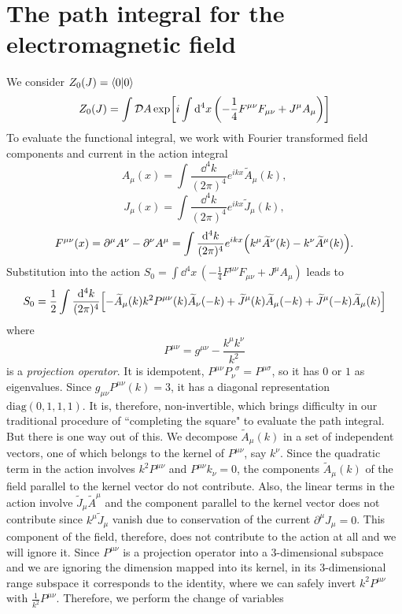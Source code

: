 \section{The path integral for the electromagnetic field}
We consider $Z_0(J)=\braket{0}$
\begin{equation}
    Z_0(J)=\int\mathcal{D}A\exp[i\int\dd^4x\,\qty(-\frac{1}{4}F^{\mu\nu}F_{\mu\nu}+J^\mu A_\mu)]
\end{equation}
To evaluate the functional integral, we work with Fourier transformed field components and current in the action integral
\begin{equation}
    A_\mu(x)=\int\frac{\dd^4 k}{(2\pi)^4}e^{ikx}\widetilde{A}_\mu(k),
\end{equation}
\begin{equation}
    J_\mu(x)=\int\frac{\dd^4 k}{(2\pi)^4}e^{ikx}\widetilde{J}_\mu(k),
\end{equation}
\begin{equation}
    F^{\mu\nu}(x)=\partial^\mu A^\nu-\partial^\nu A^\mu=\int\frac{\dd^4 k}{(2\pi)^4}e^{ikx}\qty(k^\mu\widetilde{A}^\nu(k)-k^\nu\widetilde{A}^\mu(k)).
\end{equation}
Substitution into the action $S_0=\int\dd^4x\, (-\frac{1}{4}F^{\mu\nu}F_{\mu\nu}+J^\mu A_\mu) $ leads to
\begin{equation}
    S_0=\frac{1}{2}\int\frac{\dd^4 k}{(2\pi)^4}\qty[-\widetilde{A}_\mu(k)k^2P^{\mu\nu}(k)\widetilde{A}_\nu(-k)+\widetilde{J}^\mu(k)\widetilde{A}_\mu(-k)+\widetilde{J}^\mu(-k)\widetilde{A}_\mu(k)]
\end{equation}
where 
\begin{equation}
    P^{\mu\nu}=g^{\mu\nu}-\frac{k^\mu k^\nu}{{k}^2}
\end{equation} is a \textit{projection operator}. It is idempotent, $P^{\mu\nu}P_{\nu}^{\phantom{a}\sigma}=P^{\mu\sigma}$, so it has $0$ or $1$ as eigenvalues. Since $g_{\mu\nu}P^{\mu\nu}(k)=3$, it has a diagonal representation $\text{diag}(0,1,1,1)$. It is, therefore, non-invertible, which brings difficulty in our traditional procedure of ``completing the square" to evaluate the path integral. But there is one way out of this. We decompose $\widetilde{A}_\mu(k)$ in a set of independent vectors, one of which belongs to the kernel of $P^{\mu\nu}$, say $k^\nu$. Since the quadratic term in the action involves $k^2P^{\mu\nu}$ and $P^{\mu\nu}k_\nu=0$, the components  $\widetilde{A}_\mu(k)$ of the field parallel to the kernel vector do not contribute. Also, the linear terms in the action involve $ \widetilde{J}_\mu \widetilde{A}^\mu$ and the component parallel to the kernel vector does not contribute since $k^\mu \widetilde{J}_\mu$ vanish due to conservation of the current $\partial^\mu J_\mu=0$. This component of the field, therefore, does not contribute to the action at all and we will ignore it. Since $P^{\mu\nu}$ is a projection operator into a 3-dimensional subspace and we are ignoring the dimension mapped into its kernel, in its 3-dimensional range subspace it corresponds to the identity, where we can safely invert $k^2P^{\mu\nu}$ with $\frac{1}{k^2}P^{\mu\nu}$. Therefore, we perform the change of variables
